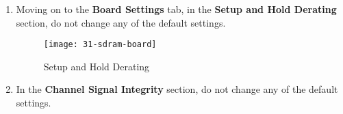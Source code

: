 \begin{flushleft}
\begin{enumerate}[
	label=\textbf{Step \arabic*.},
	leftmargin=*,
	widest={00},
	align=left]
\begin{enumerate}[
	label=\textbf{Step \arabic{enumi}\alph*.},
	leftmargin=*,
	align=left]
\item Change the \textbf{tINIT} parameter to \textbf{500}.

\item Change the \textbf{tMRD (tMRW)} parameter to \textbf{4}.

\item Change the \textbf{tRAS} parameter to \textbf{35.0}.

\item Change the \textbf{tRCD} parameter to \textbf{13.75}.

\item Change the \textbf{tRP} parameter to \textbf{13.75}.

\item Change the \textbf{tREFI (tREFIab)} parameter to \textbf{7.8}.

\item Change the \textbf{tRFC (tRFCab)} parameter to \textbf{300.0}.

\item Change the \textbf{tWTR} parameter to \textbf{4}.

\end{enumerate}

It should look like this after you do.

\begin{figure}[H]
\centering
\texttt{[image: 30-sdram-timing]}
\caption{Memory Timing}
\label{fig:30-sdram-timing}
\end{figure}

\newpage

\item Moving on to the \textbf{Board Settings} tab, in the \textbf{Setup and Hold Derating} section, do not change any of the default settings.

\begin{figure}[H]
\centering
\texttt{[image: 31-sdram-board]}
\caption{Setup and Hold Derating}
\label{fig:31-sdram-board}
\end{figure}

\item In the \textbf{Channel Signal Integrity} section, do not change any of the default settings.


\end{enumerate}
\end{flushleft}

